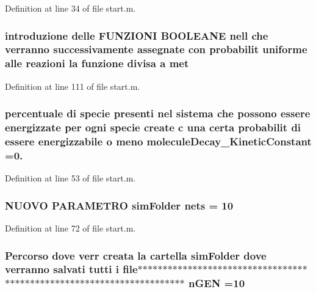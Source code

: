 Definition at line 34 of file start.\-m.

\hypertarget{a00113_a53f2a5c181e46a513a4e87f144d19f6b}{
\subsubsection[{met}]{\setlength{\rightskip}{0pt plus 5cm}introduzione delle F\-U\-N\-Z\-I\-O\-N\-I B\-O\-O\-L\-E\-A\-N\-E nell che verranno successivamente assegnate con probabilit uniforme alle {\bf reazioni} la funzione divisa {\bf a} met}}\label{a00113_a53f2a5c181e46a513a4e87f144d19f6b}


Definition at line 111 of file start.\-m.

\hypertarget{a00113_a85569bbcfd8fbc0081b5a144eaf516f5}{
\subsubsection[{molecule\-Decay\-\_\-\-Kinetic\-Constant}]{\setlength{\rightskip}{0pt plus 5cm}percentuale di specie presenti nel sistema che possono essere energizzate per ogni specie create {\bf c} una certa probabilit di essere energizzabile o meno molecule\-Decay\-\_\-\-Kinetic\-Constant =0.}}\label{a00113_a85569bbcfd8fbc0081b5a144eaf516f5}


Definition at line 53 of file start.\-m.

\hypertarget{a00113_a006c95919fb4982bffba044f13cd2a7f}{
\subsubsection[{nets}]{\setlength{\rightskip}{0pt plus 5cm}N\-U\-O\-V\-O P\-A\-R\-A\-M\-E\-T\-R\-O {\bf sim\-Folder} nets = 10}}\label{a00113_a006c95919fb4982bffba044f13cd2a7f}


Definition at line 72 of file start.\-m.

\hypertarget{a00113_a4c8fe523edbe179c5d215da13f469f72}{
\subsubsection[{n\-G\-E\-N}]{\setlength{\rightskip}{0pt plus 5cm}Percorso dove verr creata la cartella {\bf sim\-Folder} dove verranno salvati tutti {\bf i} {\bf file}$\ast$$\ast$$\ast$$\ast$$\ast$$\ast$$\ast$$\ast$$\ast$$\ast$$\ast$$\ast$$\ast$$\ast$$\ast$$\ast$$\ast$$\ast$$\ast$$\ast$$\ast$$\ast$$\ast$$\ast$$\ast$$\ast$$\ast$$\ast$$\ast$$\ast$$\ast$$\ast$$\ast$$\ast$$\ast$$\ast$$\ast$$\ast$$\ast$$\ast$$\ast$$\ast$$\ast$$\ast$$\ast$$\ast$$\ast$$\ast$$\ast$$\ast$$\ast$$\ast$$\ast$$\ast$$\ast$$\ast$$\ast$$\ast$$\ast$$\ast$$\ast$$\ast$$\ast$$\ast$$\ast$$\ast$$\ast$$\ast$$\ast$$\ast$ n\-G\-E\-N =10}}\label{a00113_a4c8fe523edbe179c5d215da13f469f72}


